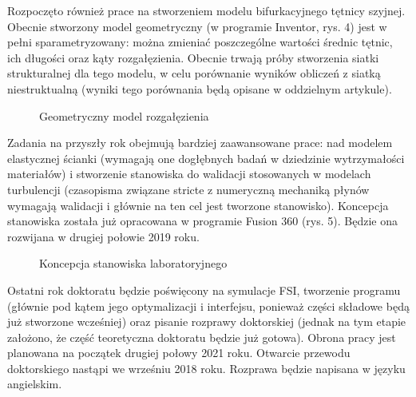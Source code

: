 \documentclass[11pt]{article} %
\begin{document}
Rozpoczęto również prace na stworzeniem modelu bifurkacyjnego tętnicy szyjnej. Obecnie stworzony model geometryczny (w programie Inventor, rys. 4) jest w pełni sparametryzowany: można zmieniać poszczególne wartości średnic tętnic, ich długości oraz kąty rozgałęzienia. Obecnie trwają próby stworzenia siatki strukturalnej dla tego modelu, w celu porównanie wyników obliczeń z siatką niestruktualną (wyniki tego porównania będą opisane w oddzielnym artykule).
\begin{figure}[H] %
\caption{Geometryczny model rozgałęzienia}
\label{fig:speciation}
\end{figure}


Zadania na przyszły rok obejmują bardziej zaawansowane prace: nad modelem elastycznej ścianki (wymagają one dogłębnych badań w dziedzinie wytrzymałości materiałów) i stworzenie stanowiska do walidacji stosowanych w modelach turbulencji (czasopisma związane stricte z numeryczną mechaniką płynów wymagają walidacji i głównie na ten cel jest tworzone stanowisko). 
Koncepcja stanowiska została już opracowana w programie Fusion 360 (rys. 5). Będzie ona rozwijana w drugiej połowie 2019 roku.
\begin{figure}[H] %
\caption{Koncepcja stanowiska laboratoryjnego}
\label{fig:speciation}
\end{figure}
Ostatni rok doktoratu będzie poświęcony na symulacje FSI, tworzenie programu (głównie pod kątem jego optymalizacji i interfejsu, ponieważ części składowe będą już stworzone wcześniej) oraz pisanie rozprawy doktorskiej (jednak na tym etapie założono, że część teoretyczna doktoratu będzie już gotowa). Obrona pracy jest planowana na początek drugiej połowy 2021 roku. Otwarcie przewodu doktorskiego nastąpi we wrześniu 2018 roku. Rozprawa będzie napisana w języku angielskim.
\end{document}
